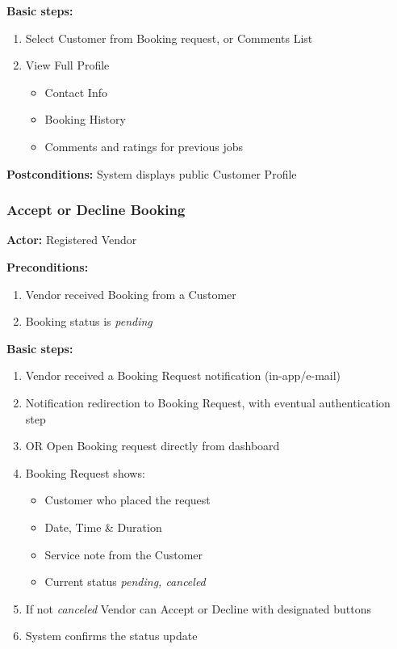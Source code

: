 \documentclass[11pt,a4paper]{article}
\begin{document}
\noindent \textbf{Basic steps:}
\begin{enumerate}
  \item Select Customer from Booking request, or Comments List
  \item View Full Profile
    \begin{itemize}
      \item Contact Info
      \item Booking History
      \item Comments and ratings for previous jobs
    \end{itemize}
\end{enumerate}

\noindent \textbf{Postconditions:} System displays public Customer Profile

\subsubsection{Accept or Decline Booking}

\textbf{Actor:} Registered Vendor

\noindent \textbf{Preconditions:}
\begin{enumerate}
  \item Vendor received Booking from a Customer
  \item Booking status is \textit{pending}
\end{enumerate}

\noindent \textbf{Basic steps:}
\begin{enumerate}
  \item Vendor received a Booking Request notification (in-app/e-mail)
  \item Notification redirection to Booking Request, with eventual
    authentication step
  \item OR Open Booking request directly from dashboard
  \item Booking Request shows:
    \begin{itemize}
      \item Customer who placed the request
      \item Date, Time \& Duration
      \item Service note from the Customer
      \item Current status \textit{pending, canceled}
    \end{itemize}
  \item If not \textit{canceled} Vendor can Accept or Decline with
    designated buttons
  \item System confirms the status update
\end{enumerate}
\end{document}
